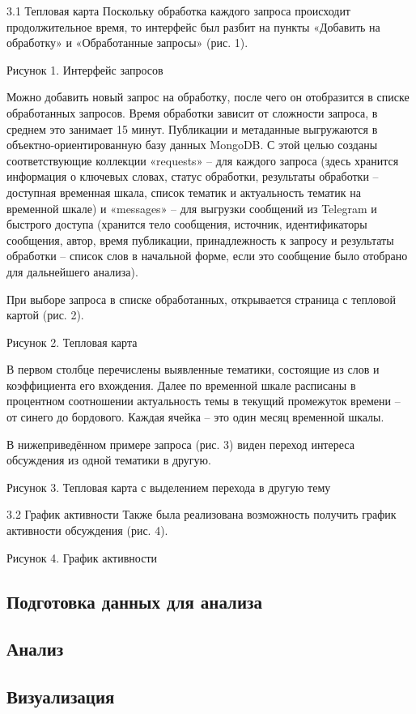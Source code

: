 \documentclass[a4paper,article,14pt]{extarticle}
\begin{document}
3.1 Тепловая карта
Поскольку обработка каждого запроса происходит продолжительное время, то интерфейс был разбит на пункты «Добавить на обработку» и «Обработанные запросы» (рис. 1).


Рисунок 1. Интерфейс запросов

Можно добавить новый запрос на обработку, после чего он отобразится в списке обработанных запросов. Время обработки зависит от сложности запроса, в среднем это занимает 15 минут.
Публикации и метаданные выгружаются в объектно-ориентированную базу данных MongoDB. С этой целью созданы соответствующие коллекции «requests» – для каждого запроса (здесь хранится информация о ключевых словах, статус обработки, результаты обработки – доступная временная шкала, список тематик и актуальность тематик на временной шкале) и «messages» – для выгрузки сообщений из Telegram и быстрого доступа (хранится тело сообщения, источник, идентификаторы сообщения, автор, время публикации, принадлежность к запросу и результаты обработки – список слов в начальной форме, если это сообщение было отобрано для дальнейшего анализа).

При выборе запроса в списке обработанных, открывается страница с тепловой картой (рис. 2).


Рисунок 2. Тепловая карта

В первом столбце перечислены выявленные тематики, состоящие из слов и коэффициента его вхождения. Далее по временной шкале расписаны в процентном соотношении актуальность темы в текущий промежуток времени – от синего до бордового. Каждая ячейка – это один месяц временной шкалы.

В нижеприведённом примере запроса (рис. 3) виден переход интереса обсуждения из одной тематики в другую.


Рисунок 3. Тепловая карта с выделением перехода в другую тему

3.2 График активности
Также была реализована возможность получить график активности обсуждения (рис. 4).


Рисунок 4. График активности

\subsection{Подготовка данных для анализа}

\subsection{Анализ}

\subsection{Визуализация}
\end{document}
